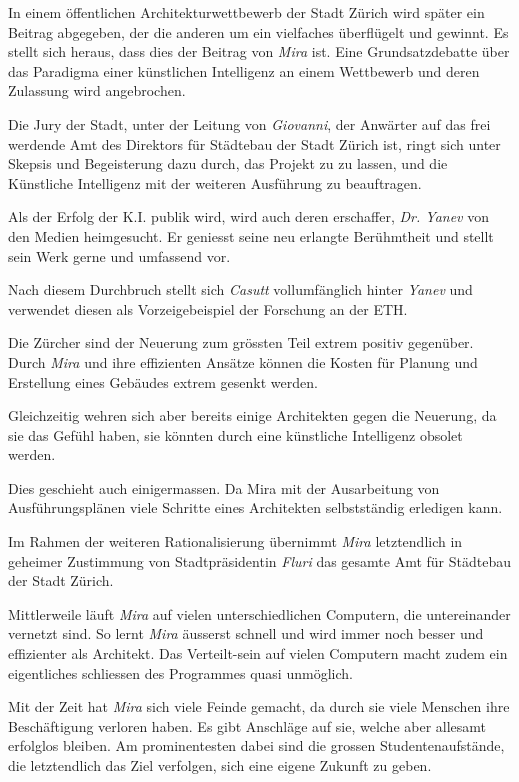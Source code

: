 \documentclass[11pt,a4paper,ngerman]{scrreprt}
\begin{document}
In einem öffentlichen Architekturwettbewerb der Stadt Zürich wird später ein
Beitrag abgegeben, der die anderen um ein vielfaches überflügelt und gewinnt. Es
stellt sich heraus, dass dies der Beitrag von \emph{Mira} ist. Eine Grundsatzdebatte
über das Paradigma einer künstlichen Intelligenz an einem Wettbewerb und deren
Zulassung wird angebrochen.

Die Jury der Stadt, unter der Leitung von \emph{Giovanni}, der Anwärter auf das frei
werdende Amt des Direktors für Städtebau der Stadt Zürich ist, ringt sich unter
Skepsis und Begeisterung dazu durch, das Projekt zu zu lassen, und die
Künstliche Intelligenz mit der weiteren Ausführung zu beauftragen.

Als der Erfolg der K.I. publik wird, wird auch deren erschaffer, \emph{Dr. Yanev} von
den Medien heimgesucht. Er geniesst seine neu erlangte Berühmtheit und stellt
sein Werk gerne und umfassend vor.

Nach diesem Durchbruch stellt sich \emph{Casutt} vollumfänglich hinter \emph{Yanev} und
verwendet diesen als Vorzeigebeispiel der Forschung an der ETH.

Die Zürcher sind der Neuerung zum grössten Teil extrem positiv gegenüber. Durch
\emph{Mira} und ihre effizienten Ansätze können die Kosten für Planung und Erstellung
eines Gebäudes extrem gesenkt werden.

Gleichzeitig wehren sich aber bereits einige Architekten gegen die Neuerung, da
sie das Gefühl haben, sie könnten durch eine künstliche Intelligenz obsolet
werden.

Dies geschieht auch einigermassen. Da Mira mit der Ausarbeitung von
Ausführungsplänen viele Schritte eines Architekten selbstständig erledigen kann.

Im Rahmen der weiteren Rationalisierung übernimmt \emph{Mira} letztendlich in
geheimer Zustimmung von Stadtpräsidentin \emph{Fluri} das gesamte Amt für
Städtebau der Stadt Zürich.

Mittlerweile läuft \emph{Mira} auf vielen unterschiedlichen Computern, die
untereinander vernetzt sind. So lernt \emph{Mira} äusserst schnell und wird immer
noch besser und effizienter als Architekt. Das Verteilt-sein auf vielen
Computern macht zudem ein eigentliches schliessen des Programmes quasi
unmöglich.

Mit der Zeit hat \emph{Mira} sich viele Feinde gemacht, da durch sie viele Menschen
ihre Beschäftigung verloren haben. Es gibt Anschläge auf sie, welche aber
allesamt erfolglos bleiben. Am prominentesten dabei sind die grossen
Studentenaufstände, die letztendlich das Ziel verfolgen, sich eine eigene
Zukunft zu geben.
\end{document}
